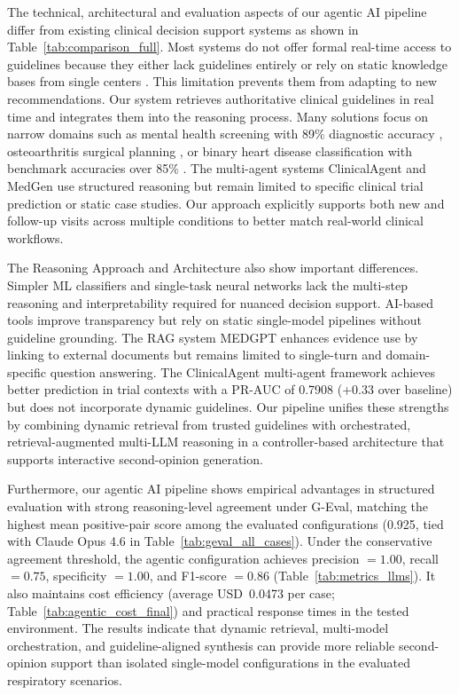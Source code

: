 \documentclass[preprint,12pt]{elsarticle}
\begin{document}
The technical, architectural and evaluation aspects of our agentic AI pipeline differ from existing clinical decision support systems as shown in Table~\ref{tab:comparison_full}. Most systems do not offer formal real-time access to guidelines because they either lack guidelines entirely \cite{r10, r12} or rely on static knowledge bases from single centers \cite{r11, r22}. This limitation prevents them from adapting to new recommendations. Our system retrieves authoritative clinical guidelines in real time and integrates them into the reasoning process. Many solutions focus on narrow domains such as mental health screening with 89\% diagnostic accuracy \cite{r10}, osteoarthritis surgical planning \cite{r11}, or binary heart disease classification with benchmark accuracies over 85\% \cite{r12}. The multi-agent systems ClinicalAgent \cite{r20} and MedGen \cite{r22} use structured reasoning but remain limited to specific clinical trial prediction or static case studies. Our approach explicitly supports both new and follow-up visits across multiple conditions to better match real-world clinical workflows.

The Reasoning Approach and Architecture also show important differences. Simpler ML classifiers and single-task neural networks lack the multi-step reasoning and interpretability required for nuanced decision support. AI-based tools \cite{r14} improve transparency but rely on static single-model pipelines without guideline grounding. The RAG system MEDGPT \cite{r16} enhances evidence use by linking to external documents but remains limited to single-turn and domain-specific question answering. The ClinicalAgent \cite{r20} multi-agent framework achieves better prediction in trial contexts with a PR-AUC of 0.7908 (+0.33 over baseline) but does not incorporate dynamic guidelines. Our pipeline unifies these strengths by combining dynamic retrieval from trusted guidelines with orchestrated, retrieval-augmented multi-LLM reasoning in a controller-based architecture that supports interactive second-opinion generation.

Furthermore, our agentic AI pipeline shows empirical advantages in structured evaluation with strong reasoning-level agreement under G-Eval, matching the highest mean positive-pair score among the evaluated configurations (0.925, tied with Claude Opus 4.6 in Table~\ref{tab:geval_all_cases}). Under the conservative agreement threshold, the agentic configuration achieves precision \(=1.00\), recall \(=0.75\), specificity \(=1.00\), and F1-score \(=0.86\) (Table~\ref{tab:metrics_llms}). It also maintains cost efficiency (average USD~0.0473 per case; Table~\ref{tab:agentic_cost_final}) and practical response times in the tested environment. The results indicate that dynamic retrieval, multi-model orchestration, and guideline-aligned synthesis can provide more reliable second-opinion support than isolated single-model configurations in the evaluated respiratory scenarios.
\end{document}
